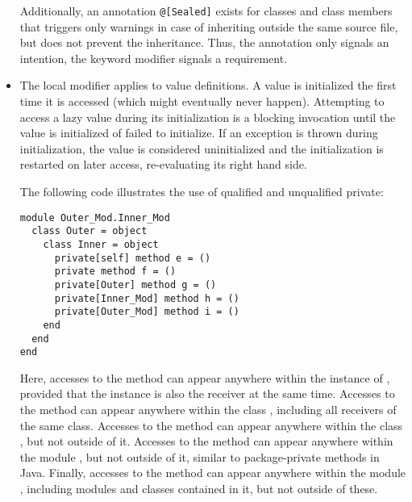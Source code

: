\begin{itemize}
  Additionally, an annotation \lstinline!@[Sealed]! exists for classes and class members that triggers only warnings in case of inheriting outside the same source file, but does not prevent the inheritance. Thus, the annotation only signals an intention, the keyword modifier signals a requirement. 

  \item The  local modifier applies to value definitions. A  value is initialized the first time it is accessed (which might eventually never happen). Attempting to access a lazy value during its initialization is a blocking invocation until the value is initialized of failed to initialize. If an exception is thrown during initialization, the value is considered uninitialized and the initialization is restarted on later access, re-evaluating its right hand side. 

\example The following code illustrates the use of qualified and unqualified private: 
\begin{lstlisting}
module Outer_Mod.Inner_Mod
  class Outer = object
    class Inner = object
      private[self] method e = ()
      private method f = ()
      private[Outer] method g = ()
      private[Inner_Mod] method h = ()
      private[Outer_Mod] method i = ()
    end
  end
end
\end{lstlisting}
Here, accesses to the method  can appear anywhere within the instance of , provided that the instance is also the receiver at the same time. Accesses to the method  can appear anywhere within the class , including all receivers of the same class. Accesses to the method  can appear anywhere within the class , but not outside of it. Accesses to the method  can appear anywhere within the module , but not outside of it, similar to package-private methods in Java. Finally, accesses to the method  can appear anywhere within the module , including modules and classes contained in it, but not outside of these.

\end{itemize}

